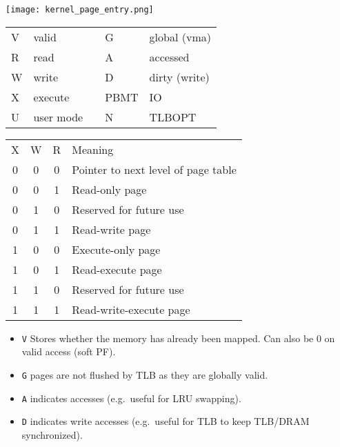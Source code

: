 \newpar{}

\begin{center}
    \texttt{[image: kernel\_page\_entry.png]}
\end{center}

\renewcommand{\arraystretch}{1.3}
\setlength{\oldtabcolsep}{\tabcolsep}\setlength\tabcolsep{6pt}

\begin{tabularx}{\linewidth}{@{}llcll@{}}
    V & valid     &  & G    & global (vma)  \\
    R & read      &  & A    & accessed      \\
    W & write     &  & D    & dirty (write) \\
    X & execute   &  & PBMT & IO            \\
    U & user mode &  & N    & TLBOPT
\end{tabularx}

\begin{tabularx}{\linewidth}{@{}cccl@{}}
    X & W & R & Meaning                             \\
    \cmidrule{1-4}
    0 & 0 & 0 & Pointer to next level of page table \\
    0 & 0 & 1 & Read-only page                      \\
    0 & 1 & 0 & Reserved for future use             \\
    0 & 1 & 1 & Read-write page                     \\
    1 & 0 & 0 & Execute-only page                   \\
    1 & 0 & 1 & Read-execute page                   \\
    1 & 1 & 0 & Reserved for future use             \\
    1 & 1 & 1 & Read-write-execute page
\end{tabularx}

\renewcommand{\arraystretch}{1}
\setlength\tabcolsep{\oldtabcolsep}

\begin{itemize}
    \item \texttt{V} Stores whether the memory has already been mapped. Can also be $0$ on valid access (soft PF).
    \item \texttt{G} pages are not flushed by TLB as they are globally valid.
    \item \texttt{A} indicates accesses (e.g.\ useful for LRU swapping).
    \item \texttt{D} indicates write accesses (e.g.\ useful for TLB to keep TLB/DRAM synchronized).
\end{itemize}

